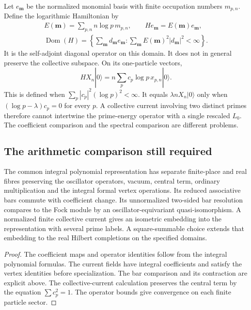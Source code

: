 Let $e_{\mathbf m}$ be the normalized monomial basis with finite
occupation numbers $m_{p,n}$. Define the logarithmic Hamiltonian by
\[
\begin{gathered}
 E(\mathbf m)=\sum_{p,n}n\log p\,m_{p,n},\qquad
 He_{\mathbf m}=E(\mathbf m)e_{\mathbf m},\\
 \operatorname{Dom}(H)=
 \left\{\sum_{\mathbf m}d_{\mathbf m}e_{\mathbf m}:
 \sum_{\mathbf m}E(\mathbf m)^2|d_{\mathbf m}|^2<\infty\right\}.
\end{gathered}
\]
It is the self-adjoint diagonal operator on this domain.
It does not in general preserve the collective subspace.
On its one-particle vectors,
\[
 H X_n|0\rangle
 =n\sum_pc_p\log p\,x_{p,n}|0\rangle.
\]
This is defined when $\sum_p|c_p|^2(\log p)^2<\infty$.
It equals $\lambda nX_n|0\rangle$ only when
$(\log p-\lambda)c_p=0$ for every $p$.
A collective current involving two distinct primes therefore cannot
intertwine the prime-energy operator with a single rescaled $L_0$.
The coefficient comparison and the spectral comparison are different problems.

\subsection{The arithmetic comparison still required}

\begin{theorem}
\label{v4-arith:c4:comparison-boundary}
The common integral polynomial representation has separate finite-place
and real fibres preserving the oscillator operators, vacuum, central term,
ordinary multiplication and the integral formal vertex operations.
Its reduced associative bars commute with coefficient change.
Its unnormalized two-sided bar resolution compares to the Fock module
by an oscillator-equivariant quasi-isomorphism.
A normalized finite collective current gives an isometric embedding
into the representation with several prime labels. A square-summable
choice extends that embedding to the real Hilbert completions on the
specified domains.

\end{theorem}

\begin{proof}
The coefficient maps and operator identities follow from the integral
polynomial formulas. The current fields have integral coefficients and
satisfy the vertex identities before specialization. The bar comparison
and its contraction are explicit above. The collective-current calculation
preserves the central term by the equation $\sum c_p^2=1$.
The operator bounds give convergence on each finite particle sector.
\end{proof}

